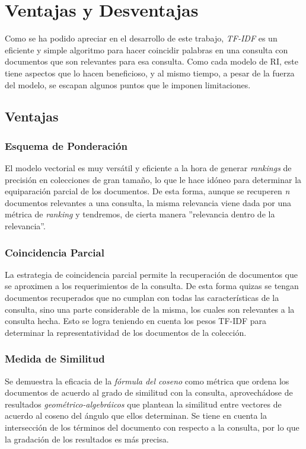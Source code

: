 \section{Ventajas y Desventajas}

Como se ha podido apreciar en el desarrollo de este trabajo, \emph{TF-IDF} es
un eficiente y simple algoritmo para hacer coincidir palabras en una consulta
con documentos que son relevantes para esa consulta. Como cada
modelo de RI, este tiene aspectos que lo hacen beneficioso, y al mismo tiempo,
a pesar de la fuerza del modelo, se escapan algunos puntos que le imponen
limitaciones.\cite{ramos, aparicio, mishra}

\subsection{Ventajas}

\subsubsection{Esquema de Ponderación}

El modelo vectorial es muy versátil y eficiente a la hora de generar
\emph{rankings} de precisión en colecciones de gran tamaño, lo que le hace
idóneo para determinar la equiparación parcial de los documentos. De esta
forma, aunque se recuperen \emph{n} documentos relevantes a una consulta, la
misma relevancia viene dada por una métrica de \emph{ranking} y tendremos, de
cierta manera ''relevancia dentro de la relevancia''.

\subsubsection{Coincidencia Parcial}

La estrategia de coincidencia parcial permite la recuperación de documentos
que se aproximen a los requerimientos de la consulta. De esta forma quizas se
tengan documentos recuperados que no cumplan con todas las características de
la consulta, sino una parte considerable de la misma, los cuales son relevantes
a la consulta hecha. Esto se logra teniendo en cuenta los pesos TF-IDF para
determinar la representatividad de los documentos de la colección.

\subsubsection{Medida de Similitud}

Se demuestra la eficacia de la \emph{fórmula del coseno} como métrica que
ordena los documentos de acuerdo al grado de similitud con la consulta,
aprovechádose de resultados \emph{geométrico-algebráicos} que plantean la
similitud entre vectores de acuerdo al coseno del ángulo que ellos determinan.
Se tiene en cuenta la intersección de los términos del documento con respecto
a la consulta, por lo que la gradación de los resultados es más precisa.


